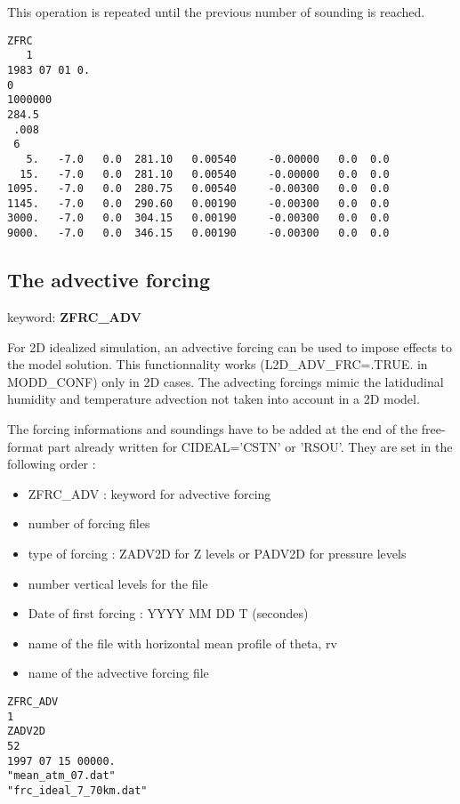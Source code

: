 This operation is repeated until the previous number of sounding is reached.

\begin{verbatim}
ZFRC
   1
1983 07 01 0.
0
1000000
284.5
 .008
 6
   5.   -7.0   0.0  281.10   0.00540     -0.00000   0.0  0.0
  15.   -7.0   0.0  281.10   0.00540     -0.00000   0.0  0.0
1095.   -7.0   0.0  280.75   0.00540     -0.00300   0.0  0.0
1145.   -7.0   0.0  290.60   0.00190     -0.00300   0.0  0.0
3000.   -7.0   0.0  304.15   0.00190     -0.00300   0.0  0.0
9000.   -7.0   0.0  346.15   0.00190     -0.00300   0.0  0.0
\end{verbatim}

\subsection{The advective forcing} \label{ss:adv_forcing}

keyword: {\bf ZFRC\_ADV} 

For 2D idealized simulation, an advective forcing can be used to impose effects to the model solution. This functionnality works (L2D\_ADV\_FRC=.TRUE. in MODD\_CONF) only in 2D cases. The advecting forcings mimic the latidudinal humidity and temperature advection not taken into account in a 2D model.
         
The forcing informations and soundings have to be added at the end of the
free-format part already written for CIDEAL='CSTN' or 'RSOU'. They are set in the following order : 
\begin{itemize}
\item ZFRC\_ADV : keyword for advective forcing
\item number of forcing files
\item type of forcing : ZADV2D for Z levels or PADV2D for  pressure levels
\item number vertical levels for the file
\item Date of first forcing : YYYY MM DD T (secondes)
\item name of the file with horizontal mean profile of theta, rv
\item name of the advective forcing file
\end{itemize}

                                   
\begin{verbatim}
ZFRC_ADV
1
ZADV2D
52
1997 07 15 00000.
"mean_atm_07.dat"
"frc_ideal_7_70km.dat"
\end{verbatim}

